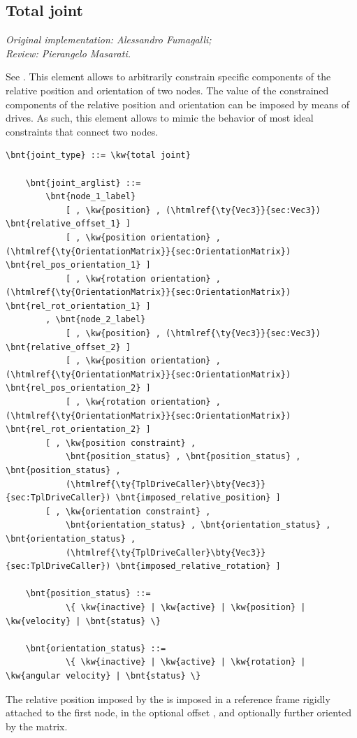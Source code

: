 \subsection{Total joint}
\label{sec:EL:STRUCT:JOINT:TOTAL_JOINT}
\emph{Original implementation: Alessandro Fumagalli; \\
Review: Pierangelo Masarati.}

See \cite{MASARATI-TOTALJ}.
This element allows to arbitrarily constrain specific components
of the relative position and orientation of two nodes.
The value of the constrained components of the relative position
and orientation can be imposed by means of drives.
As such, this element allows to mimic the behavior of most
ideal constraints that connect two nodes.
\begin{Verbatim}[commandchars=\\\{\}]
    \bnt{joint_type} ::= \kw{total joint}

    \bnt{joint_arglist} ::=
        \bnt{node_1_label}
            [ , \kw{position} , (\htmlref{\ty{Vec3}}{sec:Vec3}) \bnt{relative_offset_1} ]
            [ , \kw{position orientation} , (\htmlref{\ty{OrientationMatrix}}{sec:OrientationMatrix}) \bnt{rel_pos_orientation_1} ]
            [ , \kw{rotation orientation} , (\htmlref{\ty{OrientationMatrix}}{sec:OrientationMatrix}) \bnt{rel_rot_orientation_1} ]
        , \bnt{node_2_label}
            [ , \kw{position} , (\htmlref{\ty{Vec3}}{sec:Vec3}) \bnt{relative_offset_2} ]
            [ , \kw{position orientation} , (\htmlref{\ty{OrientationMatrix}}{sec:OrientationMatrix}) \bnt{rel_pos_orientation_2} ]
            [ , \kw{rotation orientation} , (\htmlref{\ty{OrientationMatrix}}{sec:OrientationMatrix}) \bnt{rel_rot_orientation_2} ]
        [ , \kw{position constraint} ,
            \bnt{position_status} , \bnt{position_status} , \bnt{position_status} ,
            (\htmlref{\ty{TplDriveCaller}\bty{Vec3}}{sec:TplDriveCaller}) \bnt{imposed_relative_position} ]
        [ , \kw{orientation constraint} ,
            \bnt{orientation_status} , \bnt{orientation_status} , \bnt{orientation_status} ,
            (\htmlref{\ty{TplDriveCaller}\bty{Vec3}}{sec:TplDriveCaller}) \bnt{imposed_relative_rotation} ]

    \bnt{position_status} ::=
            \{ \kw{inactive} | \kw{active} | \kw{position} | \kw{velocity} | \bnt{status} \}

    \bnt{orientation_status} ::=
            \{ \kw{inactive} | \kw{active} | \kw{rotation} | \kw{angular velocity} | \bnt{status} \}
\end{Verbatim}
The relative position imposed by the 
is imposed in a reference frame rigidly attached to the first node,
in the optional offset ,
and optionally further oriented by the 
matrix.

